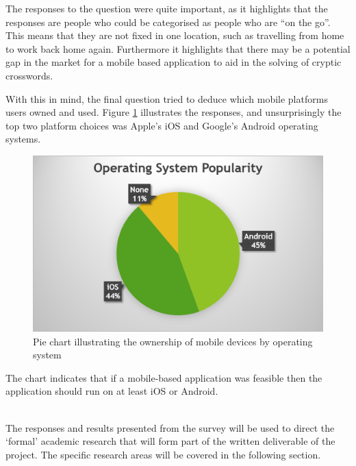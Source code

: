 The responses to the question were quite important, as it highlights that the 
responses are people who could be categorised as people who are ``on the go''. 
This means that they are not fixed in one location, such as travelling from home
to work back home again. Furthermore it highlights that there may be a potential
gap in the market for a mobile based application to aid in the solving of 
cryptic crosswords.

With this in mind, the final question tried to deduce which mobile platforms 
users owned and used. Figure \ref{fig:survey_os} illustrates the responses, and 
unsurprisingly the top two platform choices was Apple's iOS and Google's Android
operating systems.

\begin{figure}[H]
  \centering
  \includegraphics[scale=0.9]{graphs/operating_system.png}
  \caption{Pie chart illustrating the ownership of mobile devices by operating 
          system}
  \label{fig:survey_os}
\end{figure}

The chart indicates that if a mobile-based application was feasible then the 
application should run on at least iOS or Android.

~\\

The responses and results presented from the survey will be used to direct the 
`formal' academic research that will form part of the written deliverable of the
project. The specific research areas will be covered in the following section.
